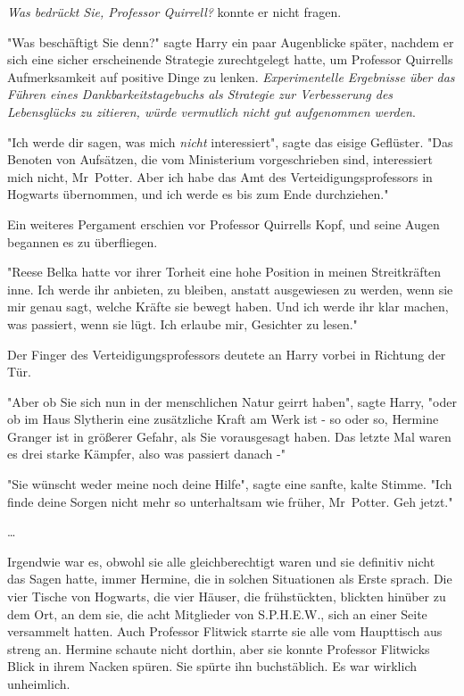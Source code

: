 {\emph{Was bedrückt Sie, Professor Quirrell?} konnte er nicht fragen.

"Was beschäftigt Sie denn?" sagte Harry ein paar Augenblicke später, nachdem er sich eine sicher erscheinende Strategie zurechtgelegt hatte, um Professor Quirrells Aufmerksamkeit auf positive Dinge zu lenken. \emph{Experimentelle Ergebnisse über das Führen eines Dankbarkeitstagebuchs als Strategie zur Verbesserung des Lebensglücks zu zitieren, würde vermutlich nicht gut aufgenommen werden}.

"Ich werde dir sagen, was mich \emph{nicht} interessiert", sagte das eisige Geflüster. "Das Benoten von Aufsätzen, die vom Ministerium vorgeschrieben sind, interessiert mich nicht, Mr~Potter. Aber ich habe das Amt des Verteidigungsprofessors in Hogwarts übernommen, und ich werde es bis zum Ende durchziehen."

Ein weiteres Pergament erschien vor Professor Quirrells Kopf, und seine Augen begannen es zu überfliegen.

"Reese Belka hatte vor ihrer Torheit eine hohe Position in meinen Streitkräften inne. Ich werde ihr anbieten, zu bleiben, anstatt ausgewiesen zu werden, wenn sie mir genau sagt, welche Kräfte sie bewegt haben. Und ich werde ihr klar machen, was passiert, wenn sie lügt. Ich erlaube mir, Gesichter zu lesen."

Der Finger des Verteidigungsprofessors deutete an Harry vorbei in Richtung der Tür.

"Aber ob Sie sich nun in der menschlichen Natur geirrt haben", sagte Harry, "oder ob im Haus Slytherin eine zusätzliche Kraft am Werk ist - so oder so, Hermine Granger ist in größerer Gefahr, als Sie vorausgesagt haben. Das letzte Mal waren es drei starke Kämpfer, also was passiert danach -"

"Sie wünscht weder meine noch deine Hilfe", sagte eine sanfte, kalte Stimme. "Ich finde deine Sorgen nicht mehr so unterhaltsam wie früher, Mr~Potter. Geh jetzt."

…

Irgendwie war es, obwohl sie alle gleichberechtigt waren und sie definitiv nicht das Sagen hatte, immer Hermine, die in solchen Situationen als Erste sprach. Die vier Tische von Hogwarts, die vier Häuser, die frühstückten, blickten hinüber zu dem Ort, an dem sie, die acht Mitglieder von S.P.H.E.W., sich an einer Seite versammelt hatten. Auch Professor Flitwick starrte sie alle vom Haupttisch aus streng an. Hermine schaute nicht dorthin, aber sie konnte Professor Flitwicks Blick in ihrem Nacken spüren. Sie spürte ihn buchstäblich. Es war wirklich unheimlich.

}
